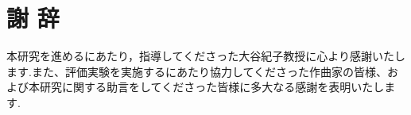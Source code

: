 \chapter*{謝 辞}
本研究を進めるにあたり，指導してくださった大谷紀子教授に心より感謝いたします.また、評価実験を実施するにあたり協力してくださった作曲家の皆様、および本研究に関する助言をしてくださった皆様に多大なる感謝を表明いたします.